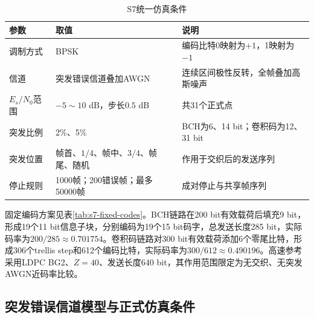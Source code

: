 \begin{table}[htbp]
  \centering
  \caption{S7统一仿真条件}
  \label{tab:s7-unified-conditions}
  \small
  \begin{tabular}{p{}p{}p{}}
    \toprule
    参数 & 取值 & 说明 \\
    \midrule
    调制方式 & BPSK & 编码比特0映射为$+1$，1映射为$-1$ \\
    信道 & 突发错误信道叠加AWGN & 连续区间极性反转，全帧叠加高斯噪声 \\
    $E_s/N_0$范围 & $-5\sim10$ dB，步长$0.5$ dB & 共31个正式点 \\
    突发比例 & 2\%、5\% & BCH为6、14 bit；卷积码为12、31 bit \\
    突发位置 & 帧首、$1/4$、帧中、$3/4$、帧尾、随机 & 作用于交织后的发送序列 \\
    停止规则 & 1000帧；200错误帧；最多50000帧 & 成对停止与共享帧序列 \\
    \bottomrule
  \end{tabular}
\end{table}

固定编码方案见表\ref{tab:s7-fixed-codes}。BCH链路在200 bit有效载荷后填充9 bit，形成19个11 bit信息子块，分别编码为19个15 bit码字，总发送长度285 bit，实际码率为$200/285\approx0.701754$。卷积码链路对300 bit有效载荷添加6个零尾比特，形成306个trellis step和612个编码比特，实际码率为$300/612\approx0.490196$。高速参考采用LDPC BG2、$Z=40$、发送长度640 bit，其作用范围限定为无交织、无突发AWGN近码率比较。

\begin{table}[htbp]
  \centering
  \caption{S7固定编码方案}
  \label{tab:s7-fixed-codes}
  \footnotesize
\end{table}

\subsection{突发错误信道模型与正式仿真条件}

